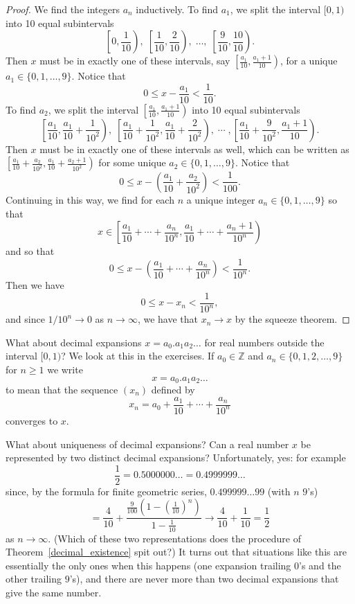 \documentclass[11pt,dvipsnames]{book}
\numberwithin{figure}{section} %
\numberwithin{table}{section} %
\begin{document}
\begin{proof}
We find the integers $a_{n}$ inductively. To find $a_1$, we split the interval $[0,1)$ into 10 equal subintervals
\[ \left[0,\frac{1}{10}\right),  \; \left[\frac{1}{10}, \frac{2}{10}\right), \; \dots , \; \left[\frac{9}{10},\frac{10}{10}\right).\]
Then $x$ must be in exactly one of these intervals, say $\left[\frac{a_1}{10}, \frac{a_1 +1}{10}\right)$, for a unique $a_1 \in \{0, 1, \dots , 9\}$.
Notice that
\[ 0 \leq x - \frac{a_1}{10} < \frac{1}{10}.\]
To find $a_2$, we split the interval $\left[\frac{a_1}{10}, \frac{a_1 +1}{10}\right)$ into 10 equal subintervals
\[
\left[\frac{a_{1}}{10},\frac{a_{1}}{10}+\frac{1}{10^2}\right),\;
\left[\frac{a_{1}}{10}+\frac{1}{10^2},\frac{a_{1}}{10}+\frac{2}{10^2}\right), \; \cdots \;
,\left[\frac{a_{1}}{10}+\frac{9}{10^2},\frac{a_{1}+1}{10}\right).
\]
Then $x$ must be in exactly one of these intervals as well, which can be written as $\left[\frac{a_{1}}{10}+\frac{a_{2}}{10^2},\frac{a_{1}}{10}+\frac{a_2+1}{10^2}\right)$ for some unique $a_{2}\in \{0,1, \dots ,9\}$. Notice that
\[ 0 \leq x - \left(\frac{a_1}{10} + \frac{a_2}{10^2}\right) < \frac{1}{100}.\]
\noindent
Continuing in this way, we find for each $n$ a unique integer $a_{n}\in \{0,1,\dots,9\}$ so that
\begin{equation*}
\label{e:xininterval}
x\in \left[\frac{a_{1}}{10}+\cdots +\frac{a_{n}}{10^{n}}, \frac{a_{1}}{10}+\cdots  +\frac{a_{n}+1}{10^{n}}\right)
\end{equation*}
and so that
\[ 0 \leq x- \left( \frac{a_{1}}{10}+\cdots +\frac{a_{n}}{10^{n}} \right) < \frac{1}{10^n}.\]
Then we have
\[ 0 \leq x - x_n < \frac{1}{10^n},\]
and since $1/10^{n} \to 0$ as $n \to \infty$, we have that $x_n \to x$ by the squeeze theorem.
\end{proof}

\medskip
What about decimal expansions $x = a_0.a_1 a_2 \dots$ for real numbers outside the interval $[0,1)$? We look at this in the exercises. If $a_0 \in \mathbb{Z}$ and $a_n \in \{0,1,2, \dots , 9\}$ for $n\geq 1$ we write
\[ x = a_0.a_1 a_2 \dots\]
to mean that the sequence $(x_n)$ defined by
\[x_n = a_0 + \frac{a_{1}}{10}+\cdots +\frac{a_{n}}{10^{n}}\]
converges to $x$.

What about uniqueness of decimal expansions? Can a real number $x$ be represented by two distinct decimal expansions? Unfortunately, yes: for example
\[ \frac{1}{2} = 0.5000000\ldots = 0.4999999\dots \]
since, by the formula for finite geometric series, $0.499999 \dots 99$ (with $n$ $9$'s)
\[= \frac{4}{10} + \frac
{\frac{9}{100}(1- (\frac{1}{10})^{n})}
{1- \frac{1}{10}} \rightarrow \frac{4}{10} + \frac{1}{10} = \frac{1}{2}\]
as $n \to \infty$. (Which of these two representations does the procedure of Theorem~\ref{decimal_existence} spit out?)
It turns out that situations like this are essentially the only ones when this happens (one expansion trailing $0$'s and the other trailing $9$'s), and there are never more than two decimal expansions that give the same number.
\end{document}
